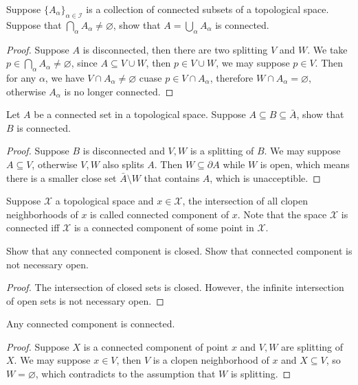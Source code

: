\documentclass[./main.tex]{subfiles}
\begin{document}
\begin{theorem}
  Suppose $\{ A_\alpha \}_{\alpha \in \mathcal{I}}$ is a collection of connected
  subsets of a topological space. Suppose that $\bigcap_\alpha A_\alpha \neq \varnothing$,
  show that $A = \bigcup_\alpha A_\alpha$ is connected.
\end{theorem}
\begin{proof}
  Suppose $A$ is disconnected, then there are two splitting $V$ and $W$.
  We take $p \in \bigcap_\alpha A_\alpha \neq \varnothing$, since $A \subseteq V \cup W$,
  then $p \in V \cup W$, we may suppose $p \in V$.
  Then for any $\alpha$, we have $V \cap A_\alpha \neq \varnothing$ cuase $p \in V \cap A_\alpha$,
  therefore $W \cap A_\alpha = \varnothing$, otherwise $A_\alpha$ is no longer connected.
\end{proof}

\begin{theorem}
  Let $A$ be a connected set in a topological space. Suppose $A \subseteq B \subseteq \bar{A}$,
  show that $B$ is connected.
\end{theorem}
\begin{proof}
  Suppose $B$ is disconnected and $V, W$ is a splitting of $B$.
  We may suppose $A \subseteq V$, otherwise $V, W$ also splits $A$.
  Then $W \subseteq \partial A$ while $W$ is open, which means there is
  a smaller close set $\bar{A} \setminus W$ that contains $A$, which is unacceptible.
\end{proof}

\begin{definition}
  Suppose $\mathcal{X}$ a topological space and $x \in \mathcal{X}$, the intersection
  of all clopen neighborhoods of $x$ is called connected component of $x$.
  Note that the space $\mathcal{X}$ is connected iff $\mathcal{X}$ is a connected component
  of some point in $\mathcal{X}$.
\end{definition}

\begin{theorem}
  Show that any connected component is closed.
  Show that connected component is not necessary open.
\end{theorem}
\begin{proof}
  The intersection of closed sets is closed.
  However, the infinite intersection of open sets is not necessary open.
\end{proof}

\begin{lemma}
  Any connected component is connected.
\end{lemma}
\begin{proof}
  Suppose $X$ is a connected component of point $x$ and $V, W$ are splitting of $X$.
  We may suppose $x \in V$, then $V$ is a clopen neighborhood of $x$
  and $X \subseteq V$, so $W = \varnothing$, which contradicts to the assumption that
  $W$ is splitting.
\end{proof}
\end{document}
